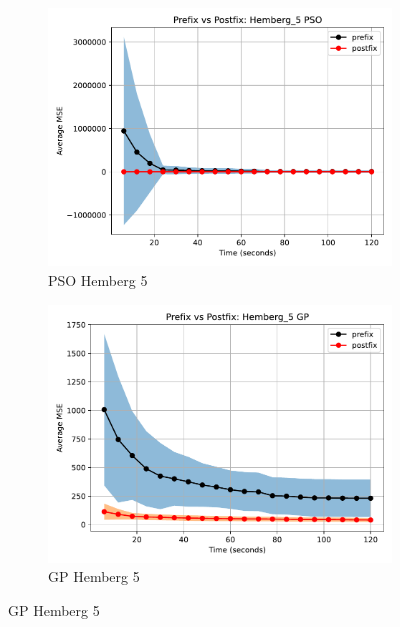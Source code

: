 \documentclass[runningheads]{llncs}
\begin{document}
\begin{figure}
    \vspace{0.5cm}
    
    \begin{subfigure}[b]{0.4\textwidth}
        \includegraphics[width=\linewidth, keepaspectratio]{Hemberg_Benchmarks/PrePostHemberg_5PSO.pdf}
        \caption{PSO Hemberg 5}
        \label{subfig:hemberg_5_PSO}
    \end{subfigure}
    \begin{subfigure}[b]{0.4\textwidth}
        \includegraphics[width=\linewidth, keepaspectratio]{Hemberg_Benchmarks/PrePostHemberg_5GP.pdf}
        \caption{GP Hemberg 5}
        \label{subfig:hemberg_5_GP}
    \end{subfigure}
    

\end{figure}
\end{document}
